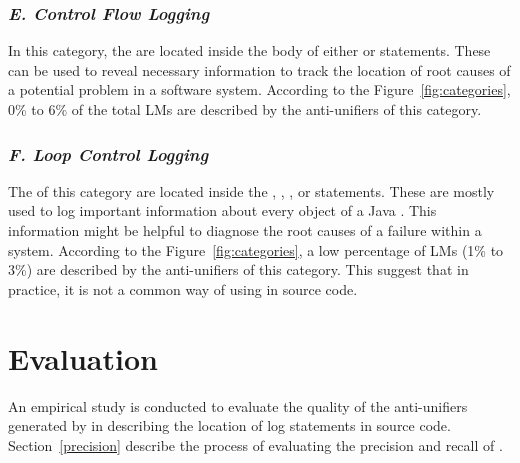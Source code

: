 \subsubsection{\emph{E. Control Flow Logging}}  \label{Exception try-block logging}
In this category, the  are located inside the body of either  or  statements. These  can be used to reveal necessary information to track the location of root causes of a potential problem in a software system. According to the Figure~\ref{fig:categories}, 0\% to 6\% of the total LMs are described by the anti-unifiers of this category.


\subsubsection{\emph{F. Loop Control Logging}}  \label{loop control logging}
The  of this category are located inside the , , , or  statements. These  are mostly used to log important information about every object of a Java . This information might be helpful to diagnose the root causes of a failure within a system. According to the Figure~\ref{fig:categories}, a low percentage of LMs (1\% to 3\%) are described by the anti-unifiers of this category. This suggest that in practice, it is not a common way of using  in source code.


\section{Evaluation}  \label{evaluation}
An empirical study is conducted to evaluate the quality of the anti-unifiers generated by  in describing the location of log statements in source code. Section~\ref{precision} describe the process of evaluating the precision and recall of .


